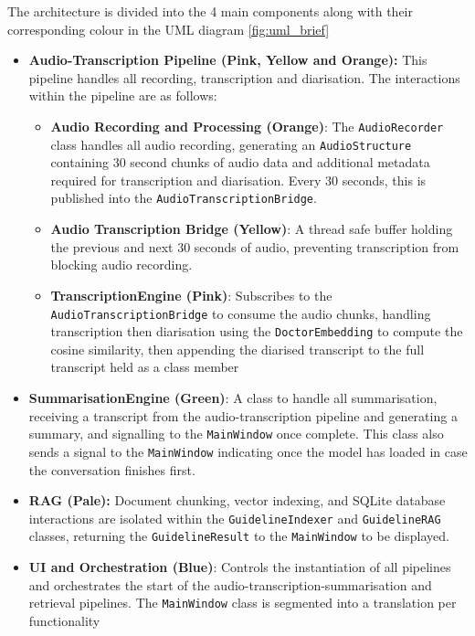 The architecture is divided into the 4 main components along with their corresponding colour in the UML diagram \ref{fig:uml_brief} 
\begin{itemize}
    \item \textbf{Audio-Transcription Pipeline (Pink, Yellow and Orange):} This pipeline handles all recording, transcription and diarisation. The interactions within the pipeline are as follows:
    \begin{itemize}
        \item \textbf{Audio Recording and Processing (Orange)}: The \texttt{AudioRecorder} class handles all audio recording, generating an \texttt{AudioStructure} containing 30 second chunks of audio data and additional metadata required for transcription and diarisation. Every 30 seconds, this is published into the \texttt{AudioTranscriptionBridge}.
        \item \textbf{Audio Transcription Bridge (Yellow)}: A thread safe buffer holding the previous and next 30 seconds of audio, preventing transcription from blocking audio recording.
        \item \textbf{TranscriptionEngine (Pink)}: Subscribes to the \texttt{AudioTranscriptionBridge} to consume the audio chunks, handling transcription then diarisation using the \texttt{DoctorEmbedding} to compute the cosine similarity, then appending the diarised transcript to the full transcript held as a class member
    \end{itemize}
    \item \textbf{SummarisationEngine (Green)}: A class to handle all summarisation, receiving a transcript from the audio-transcription pipeline and generating a summary, and signalling to the \texttt{MainWindow} once complete. This class also sends a signal to the \texttt{MainWindow} indicating once the model has loaded in case the conversation finishes first.
    \item \textbf{RAG (Pale):} Document chunking, vector indexing, and SQLite database interactions are isolated within the \texttt{GuidelineIndexer} and \texttt{GuidelineRAG} classes, returning the \texttt{GuidelineResult} to the \texttt{MainWindow} to be displayed.
    \item \textbf{UI and Orchestration (Blue)}: Controls the instantiation of all pipelines and orchestrates the start of the audio-transcription-summarisation and retrieval pipelines. The \texttt{MainWindow} class is segmented into a translation per functionality
\end{itemize}

